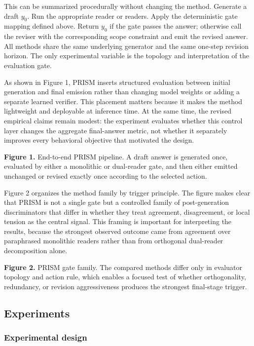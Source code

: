 \documentclass{article}
\begin{document}
This can be summarized procedurally without changing the method. Generate a draft \(y_0\). Run the appropriate reader or readers. Apply the deterministic gate mapping defined above. Return \(y_0\) if the gate passes the answer; otherwise call the reviser with the corresponding scope constraint and emit the revised answer. All methods share the same underlying generator and the same one-step revision horizon. The only experimental variable is the topology and interpretation of the evaluation gate.

As shown in Figure 1, PRISM inserts structured evaluation between initial generation and final emission rather than changing model weights or adding a separate learned verifier. This placement matters because it makes the method lightweight and deployable at inference time. At the same time, the revised empirical claims remain modest: the experiment evaluates whether this control layer changes the aggregate final-answer metric, not whether it separately improves every behavioral objective that motivated the design.



\textbf{Figure 1.} End-to-end PRISM pipeline. A draft answer is generated once, evaluated by either a monolithic or dual-reader gate, and then either emitted unchanged or revised exactly once according to the selected action.

Figure 2 organizes the method family by trigger principle. The figure makes clear that PRISM is not a single gate but a controlled family of post-generation discriminators that differ in whether they treat agreement, disagreement, or local tension as the central signal. This framing is important for interpreting the results, because the strongest observed outcome came from agreement over paraphrased monolithic readers rather than from orthogonal dual-reader decomposition alone.



\textbf{Figure 2.} PRISM gate family. The compared methods differ only in evaluator topology and action rule, which enables a focused test of whether orthogonality, redundancy, or revision aggressiveness produces the strongest final-stage trigger.

\subsection{Experiments}

\label{sec:experiments}

\subsubsection{Experimental design}
\end{document}
